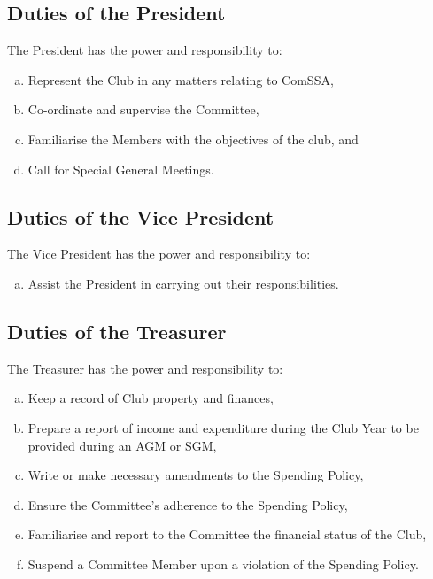 \documentclass[a4paper,12pt]{article}
\begin{document}
\subsection{Duties of the President}

The President has the power and responsibility to:

\begin{enumerate}[a)]
	\item Represent the Club in any matters relating to ComSSA,
	\item Co-ordinate and supervise the Committee,
	\item Familiarise the Members with the objectives of the club, and
	\item Call for Special General Meetings.
\end{enumerate}

\subsection{Duties of the Vice President}

The Vice President has the power and responsibility to:

\begin{enumerate}[a)]
	\item Assist the President in carrying out their responsibilities.
\end{enumerate}

\subsection{Duties of the Treasurer}

The Treasurer has the power and responsibility to:

\begin{enumerate}[a)]
	\item Keep a record of Club property and finances,
	\item Prepare a report of income and expenditure during the Club Year to be provided during an AGM or SGM,
	\item Write or make necessary amendments to the Spending Policy,
	\item Ensure the Committee's adherence to the Spending Policy,
	\item Familiarise and report to the Committee the financial status of the Club,
	\item Suspend a Committee Member upon a violation of the Spending Policy.
\end{enumerate}
\end{document}
